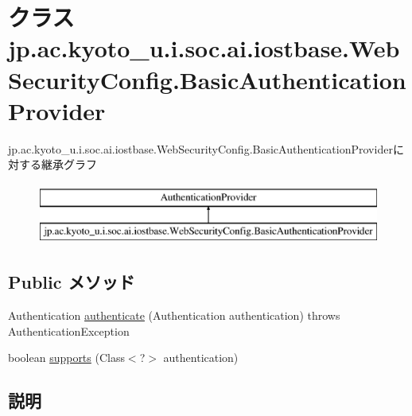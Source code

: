 \hypertarget{classjp_1_1ac_1_1kyoto__u_1_1i_1_1soc_1_1ai_1_1iostbase_1_1_web_security_config_1_1_basic_authentication_provider}{\section{クラス jp.\-ac.\-kyoto\-\_\-u.\-i.\-soc.\-ai.\-iostbase.\-Web\-Security\-Config.\-Basic\-Authentication\-Provider}
\label{classjp_1_1ac_1_1kyoto__u_1_1i_1_1soc_1_1ai_1_1iostbase_1_1_web_security_config_1_1_basic_authentication_provider}
}
jp.\-ac.\-kyoto\-\_\-u.\-i.\-soc.\-ai.\-iostbase.\-Web\-Security\-Config.\-Basic\-Authentication\-Providerに対する継承グラフ\begin{figure}[H]
\begin{center}
\leavevmode
\includegraphics[height=2.000000cm]{classjp_1_1ac_1_1kyoto__u_1_1i_1_1soc_1_1ai_1_1iostbase_1_1_web_security_config_1_1_basic_authentication_provider}
\end{center}
\end{figure}
\subsection*{Public メソッド}
\begin{DoxyCompactItemize}
\item 
Authentication \hyperlink{classjp_1_1ac_1_1kyoto__u_1_1i_1_1soc_1_1ai_1_1iostbase_1_1_web_security_config_1_1_basic_authentication_provider_abd72fb0a43b3f714b1cb77a5bba4d325}{authenticate} (Authentication authentication)  throws Authentication\-Exception 
\item 
boolean \hyperlink{classjp_1_1ac_1_1kyoto__u_1_1i_1_1soc_1_1ai_1_1iostbase_1_1_web_security_config_1_1_basic_authentication_provider_a3dbe290e14048fd0161507c956fe4289}{supports} (Class$<$?$>$ authentication)
\end{DoxyCompactItemize}


\subsection{説明}


